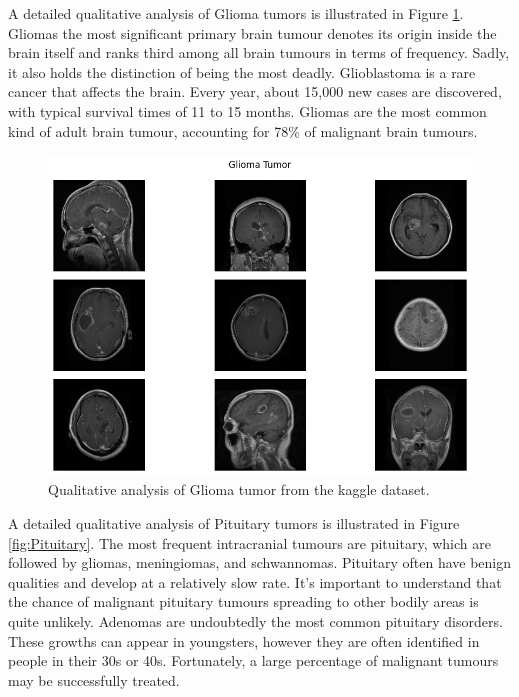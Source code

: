 \documentclass[12pt, a4paper,twoside]{report}
\theoremstyle{plain} %
\theoremstyle{definition} %
\theoremstyle{remark} %
\numberwithin{equation}{chapter}
\begin{document}
A detailed qualitative analysis of Glioma tumors is illustrated in Figure \ref{fig:Glioma}. Gliomas the most significant primary brain tumour denotes its origin inside the brain itself and ranks third among all brain tumours in terms of frequency. Sadly, it also holds the distinction of being the most deadly. Glioblastoma is a rare cancer that affects the brain. Every year, about 15,000 new cases are discovered, with typical survival times of 11 to 15 months. Gliomas are the most common kind of adult brain tumour, accounting for 78\% of malignant brain tumours.

\begin{figure}
    \centering
    \includegraphics[scale=0.7]{Glioma.png}
    \caption{Qualitative analysis of Glioma tumor from the kaggle dataset.}
    \label{fig:Glioma}
\end{figure}

A detailed qualitative analysis of Pituitary tumors is illustrated in Figure \ref{fig:Pituitary}. The most frequent intracranial tumours are pituitary, which are followed by gliomas, meningiomas, and schwannomas. Pituitary often have benign qualities and develop at a relatively slow rate. It's important to understand that the chance of malignant pituitary tumours spreading to other bodily areas is quite unlikely. Adenomas are undoubtedly the most common pituitary disorders. These growths can appear in youngsters, however they are often identified in people in their 30s or 40s. Fortunately, a large percentage of malignant tumours may be successfully treated.
\end{document}
